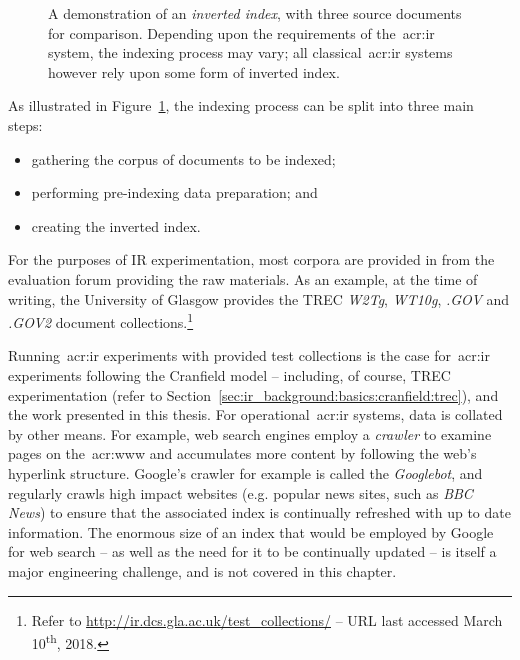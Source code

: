 \begin{figure}[t!]
    \centering
    \caption[Illustration of an \emph{Inverted index}]{A demonstration of an \emph{inverted index}, with three source documents for comparison. Depending upon the requirements of the~\gls{acr:ir} system, the indexing process may vary; all classical~\gls{acr:ir} systems however rely upon some form of inverted index.}
    \label{fig:inverted}
\end{figure}

As illustrated in Figure~\ref{fig:inverted}, the indexing process can be split into three main steps: 

\begin{itemize}
    \item{gathering the corpus of documents to be indexed;}
    \item{performing pre-indexing data preparation; and}
    \item{creating the inverted index.}
\end{itemize}

For the purposes of IR experimentation, most corpora are provided in from the evaluation forum providing the raw materials. As an example, at the time of writing, the University of Glasgow provides the TREC \emph{W2Tg}, \emph{WT10g}, \emph{.GOV} and \emph{.GOV2} document collections.\footnote{Refer to \url{http://ir.dcs.gla.ac.uk/test_collections/} -- URL last accessed March 10\textsuperscript{th}, 2018.}

Running~\gls{acr:ir} experiments with provided test collections is the case for~\gls{acr:ir} experiments following the Cranfield model -- including, of course, TREC experimentation (refer to Section~\ref{sec:ir_background:basics:cranfield:trec}), and the work presented in this thesis. For operational~\gls{acr:ir} systems, data is collated by other means. For example, web search engines employ a \emph{crawler} to examine pages on the~\gls{acr:www} and accumulates more content by following the web's hyperlink structure. Google's crawler for example is called the \emph{Googlebot}, and regularly crawls high impact websites (e.g. popular news sites, such as \emph{BBC News}) to ensure that the associated index is continually refreshed with up to date information. The enormous size of an index that would be employed by Google for web search -- as well as the need for it to be continually updated -- is itself a major engineering challenge, and is not covered in this chapter.

